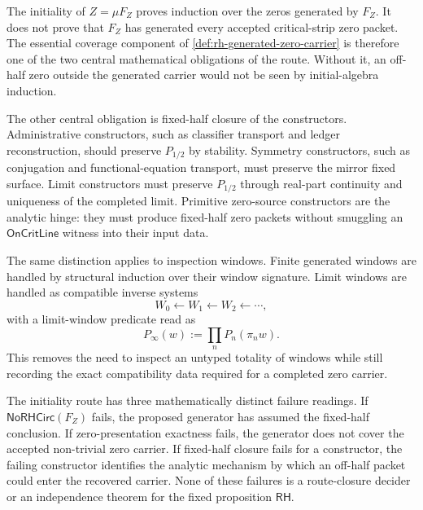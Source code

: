 \begin{principle}
\label{prin:rh-initiality-not-zero-completeness}
The initiality of $Z=\mu F_Z$ proves induction over the zeros generated by
$F_Z$. It does not prove that $F_Z$ has generated every accepted
critical-strip zero packet. The essential coverage component of
\autoref{def:rh-generated-zero-carrier} is therefore one of the two central
mathematical obligations of the route. Without it, an off-half zero outside
the generated carrier would not be seen by initial-algebra induction.
\end{principle}

\begin{principle}
\label{prin:rh-constructor-closure-fixed-half-hinge}
The other central obligation is fixed-half closure of the constructors.
Administrative constructors, such as classifier transport and ledger
reconstruction, should preserve $P_{1/2}$ by stability. Symmetry
constructors, such as conjugation and functional-equation transport, must
preserve the mirror fixed surface. Limit constructors must preserve
$P_{1/2}$ through real-part continuity and uniqueness of the completed
limit. Primitive zero-source constructors are the analytic hinge: they must
produce fixed-half zero packets without smuggling an
$\mathsf{OnCritLine}$ witness into their input data.
\end{principle}

\begin{principle}
\label{prin:rh-window-induction-limit-windows}
The same distinction applies to inspection windows. Finite generated
windows are handled by structural induction over their window signature.
Limit windows are handled as compatible inverse systems
$$
W_0\leftarrow W_1\leftarrow W_2\leftarrow\cdots,
$$
with a limit-window predicate read as
$$
P_{\infty}(w):=\prod_n P_n(\pi_n w).
$$
This removes the need to inspect an untyped totality of windows while still
recording the exact compatibility data required for a completed zero
carrier.
\end{principle}

\begin{principle}
\label{prin:rh-initiality-route-failure-readings}
The initiality route has three mathematically distinct failure readings.
If $\mathsf{NoRHCirc}(F_Z)$ fails, the proposed generator has assumed the
fixed-half conclusion. If zero-presentation exactness fails, the generator
does not cover the accepted non-trivial zero carrier. If fixed-half closure
fails for a constructor, the failing constructor identifies the analytic
mechanism by which an off-half packet could enter the recovered carrier.
None of these failures is a route-closure decider or an independence
theorem for the fixed proposition $\mathsf{RH}$.
\end{principle}

